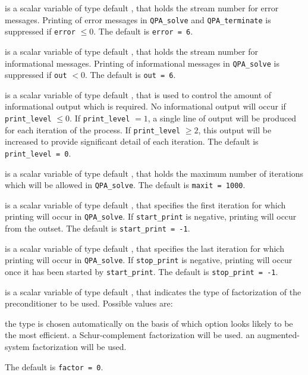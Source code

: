 \begin{description}

 is a scalar variable of type default \integer, that holds the
stream number for error messages. Printing of error messages in
{\tt QPA\_solve} and {\tt QPA\_terminate}
is suppressed if {\tt error} $\leq 0$.
The default is {\tt error = 6}.

 is a scalar variable of type default \integer, that holds the
stream number for informational messages. Printing of informational messages in
{\tt QPA\_solve} is suppressed if {\tt out} $< 0$.
The default is {\tt out = 6}.

 is a scalar variable of type default \integer, that is used
to control the amount of informational output which is required. No
informational output will occur if {\tt print\_level} $\leq 0$. If
{\tt print\_level} $= 1$, a single line of output will be produced for each
iteration of the process. If {\tt print\_level} $\geq 2$, this output will be
increased to provide significant detail of each iteration.
The default is {\tt print\_level = 0}.

 is a scalar variable of type default \integer, that holds the
maximum number of iterations which will be allowed in {\tt QPA\_solve}.
The default is {\tt maxit = 1000}.

 is a scalar variable of type default \integer, that specifies
the first iteration for which printing will occur in {\tt QPA\_solve}.
If {\tt start\_print} is negative, printing will occur from the outset.
The default is {\tt start\_print = -1}.

 is a scalar variable of type default \integer, that specifies
the last iteration for which printing will occur in  {\tt QPA\_solve}.
If {\tt stop\_print} is negative, printing will occur once it has been
started by {\tt start\_print}.
The default is {\tt stop\_print = -1}.

 is a scalar variable of type default \integer, that indicates
the type of factorization of the preconditioner to be used.
Possible values are:

\begin{description}
 the type is chosen automatically on the basis of which option looks
        likely to be the most efficient.
 a Schur-complement factorization will be used.
 an augmented-system factorization will be used.
\end{description}
The default is {\tt factor = 0}.


\end{description}
